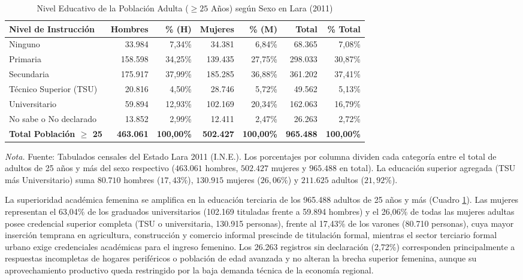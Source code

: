\documentclass[12pt,letterpaper]{article}
\begin{document}
\begin{table}[htbp]
    \centering
    \caption{Nivel Educativo de la Población Adulta ($\ge 25$ Años) según Sexo en Lara (2011)}
    \label{tab:instruccion}
    \small
    \begin{tabularx}{\textwidth}{>{\raggedright\arraybackslash}Xrrrrrr}
        \toprule
        \textbf{Nivel de Instrucción} & \textbf{Hombres} & \textbf{\% (H)} & \textbf{Mujeres} & \textbf{\% (M)} & \textbf{Total} & \textbf{\% Total} \\
        \midrule
        Ninguno & 33.984 & 7,34\% & 34.381 & 6,84\% & 68.365 & 7,08\% \\
        Primaria & 158.598 & 34,25\% & 139.435 & 27,75\% & 298.033 & 30,87\% \\
        Secundaria & 175.917 & 37,99\% & 185.285 & 36,88\% & 361.202 & 37,41\% \\
        Técnico Superior (TSU) & 20.816 & 4,50\% & 28.746 & 5,72\% & 49.562 & 5,13\% \\
        Universitario & 59.894 & 12,93\% & 102.169 & 20,34\% & 162.063 & 16,79\% \\
        No sabe o No declarado & 13.852 & 2,99\% & 12.411 & 2,47\% & 26.263 & 2,72\% \\
        \midrule
        \textbf{Total Población $\ge$ 25} & \textbf{463.061} & \textbf{100,00\%} & \textbf{502.427} & \textbf{100,00\%} & \textbf{965.488} & \textbf{100,00\%} \\
        \bottomrule
    \end{tabularx}
    \par\vspace{2pt}\noindent\raggedright \small \textit{Nota.} Fuente: Tabulados censales del Estado Lara 2011 (I.N.E.). Los porcentajes por columna dividen cada categoría entre el total de adultos de 25 años y más del sexo respectivo ($463.061$ hombres, $502.427$ mujeres y $965.488$ en total). La educación superior agregada (TSU más Universitario) suma $80.710$ hombres ($17{,}43\%$), $130.915$ mujeres ($26{,}06\%$) y $211.625$ adultos ($21{,}92\%$).
\end{table}

La superioridad académica femenina se amplifica en la educación terciaria de los 965.488 adultos de 25 años y más (Cuadro \ref{tab:instruccion}). Las mujeres representan el 63,04\% de los graduados universitarios (102.169 tituladas frente a 59.894 hombres) y el 26,06\% de todas las mujeres adultas posee credencial superior completa (TSU o universitaria, 130.915 personas), frente al 17,43\% de los varones (80.710 personas), cuya mayor inserción temprana en agricultura, construcción y comercio informal prescinde de titulación formal, mientras el sector terciario formal urbano exige credenciales académicas para el ingreso femenino. Los 26.263 registros sin declaración (2,72\%) corresponden principalmente a respuestas incompletas de hogares periféricos o población de edad avanzada y no alteran la brecha superior femenina, aunque su aprovechamiento productivo queda restringido por la baja demanda técnica de la economía regional.
\end{document}
